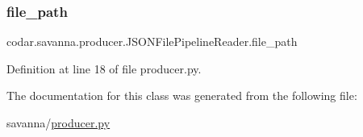 \subsubsection{\texorpdfstring{file\+\_\+path}{file\_path}}
{\footnotesize\ttfamily codar.\+savanna.\+producer.\+J\+S\+O\+N\+File\+Pipeline\+Reader.\+file\+\_\+path}



Definition at line 18 of file producer.\+py.



The documentation for this class was generated from the following file\+:\begin{DoxyCompactItemize}
\item 
savanna/\hyperlink{producer_8py}{producer.\+py}\end{DoxyCompactItemize}
